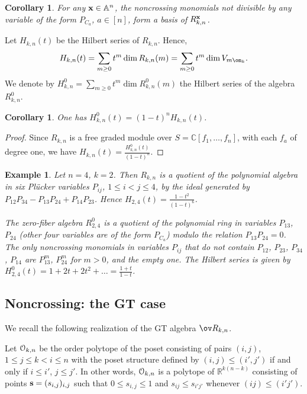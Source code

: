 \documentclass[11pt]{amsart}
\numberwithin{equation}{section}
\newtheorem{cor}[thm]{Corollary}
\newtheorem{example}[thm]{Example}
\newcommand{\bC}{{\mathbb C}}
\newcommand{\bR}{{\mathbb R}}
\newcommand{\bA}{{\mathbb A}}
\newcommand{\eO}{\EuScript{O}}
\newcommand{\bfx}{{\bf x}}
\newcommand{\bfs}{{\bf s}}
\begin{document}
\begin{cor}
For any $\bfx\in\bA^n$, the noncrossing monomials not divisible by any variable of the 
form $P_{C_a}$, $a\in [n]$, form a basis of $R^\bfx_{k,n}$.
\end{cor}

Let $H_{k,n}(t)$ be the Hilbert series of $R_{k,n}$. Hence, 
\[
H_{k,n}(t) = \sum_{m\ge 0} t^m \dim R_{k,n}(m) = \sum_{m\ge 0} t^m\dim V_{m\om_k}.
\]
We denote by $H^0_{k,n}=\sum_{m\ge 0} t^m \dim R^0_{k,n}(m)$ the Hilbert series 
of the algebra $R^0_{k,n}$.

\begin{cor}\label{cor:H0}
One has $H^0_{k,n}(t)=(1-t)^nH_{k,n}(t)$.
\end{cor}
\begin{proof}
Since $R_{k,n}$ is a free graded module over
$S=\bC[f_1,\ldots,f_n]$, with each $f_a$ of degree one,
we have $H_{k,n}(t)=\frac{H^0_{k,n}(t)}{(1-t)^n}$.
\end{proof}

\begin{example}
Let $n=4$, $k=2$. Then $R_{k,n}$ is a quotient of the polynomial algebra in six Pl\"ucker 
variables $P_{ij}$, $1\le i<j\le 4$, by the ideal generated by $P_{12}P_{34}-P_{13}P_{24}+P_{14}P_{23}$. 
Hence $H_{2,4}(t) = \frac{1-t^2}{(1-t)^6}$.

The zero-fiber algebra $R^0_{2,4}$ is  a quotient of the polynomial ring in variables $P_{13}$,
$P_{24}$ (other four variables are of the form $P_{C_a}$) modulo the relation $P_{13}P_{24}=0$.
The only noncrossing monomials in variables $P_{ij}$ that do not contain $P_{12}$, $P_{23}$,
$P_{34}$, $P_{14}$ are $P_{13}^m$, $P_{24}^m$ for $m>0$, and the empty one.
The Hilbert series is given by $H^0_{2,4}(t) = 1 + 2t + 2t^2 + \dots = \frac{1+t}{1-t}$.
\end{example}

\subsection{Noncrossing: the GT case}
We recall the following realization of the GT algebra $\ov R_{k,n}$. 

Let
$\eO_{k,n}$ be the order polytope \cite{Sta86} of the poset consisting of pairs $(i,j)$,
$1\le j\le k < i \le n$ with the poset structure defined by $(i,j)\le (i',j')$
if and only if $i\le i'$, $j\le j'$. In other words, $\eO_{k,n}$ is a polytope of 
$\bR^{k(n-k)}$ consisting of points $\bfs=(s_{i,j})_{i,j}$ such that 
$0\le s_{i,j}\le 1$ and $s_{ij}\le s_{i'j'}$ whenever $(ij)\le (i'j')$.
\end{document}
